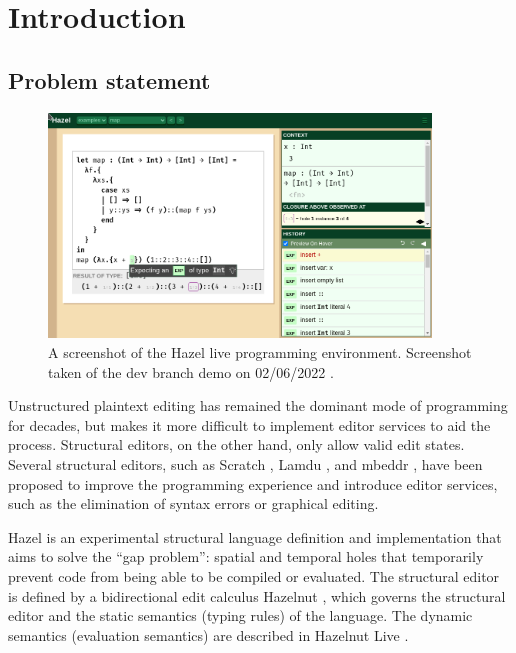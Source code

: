 \chapter{Introduction}
\label{sec:introduction}

\section{Problem statement}
\label{sec:prob_stmt}

\begin{figure}
  \centering
  \includegraphics[width=4in]{img/hazel_ui.png}
  \caption[Screenshot of the Hazel live programming environment.]{A screenshot of the Hazel live programming environment. Screenshot taken of the dev branch demo on 02/06/2022 \cite{HazelDemo2022}.}
  \label{fig:screenshot-hazel-ui}
\end{figure}

Unstructured plaintext editing has remained the dominant mode of programming for decades, but makes it more difficult to implement editor services to aid the process. Structural editors, on the other hand, only allow valid edit states. Several structural editors, such as Scratch \cite{maloney2010scratch}, Lamdu \cite{lotem_chuchem}, and mbeddr \cite{voelter2012mbeddr}, have been proposed to improve the programming experience and introduce editor services, such as the elimination of syntax errors or graphical editing.

Hazel \cite{hazel_git} is an experimental structural language definition and implementation that aims to solve the ``gap problem'': spatial and temporal holes that temporarily prevent code from being able to be compiled or evaluated. The structural editor is defined by a bidirectional edit calculus Hazelnut \cite{conf/popl/Hazelnut17}, which governs the structural editor and the static semantics (typing rules) of the language. The dynamic semantics (evaluation semantics) are described in Hazelnut Live \cite{conf/popl/HazelnutLive19}.

